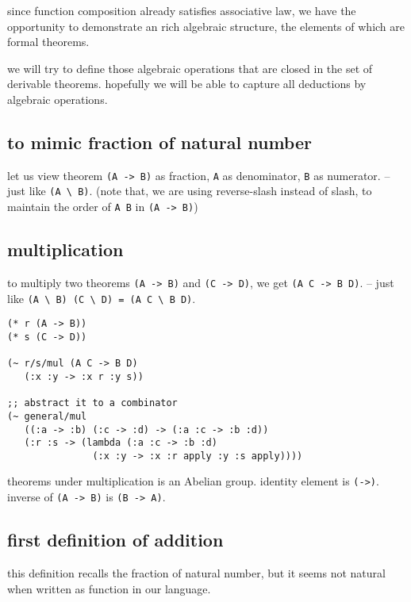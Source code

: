 \documentclass{sigplanconf}
\begin{document}
since function composition already satisfies associative law,
we have the opportunity to demonstrate an rich algebraic structure,
the elements of which are formal theorems.

we will try to define those algebraic operations that are closed in the set of derivable theorems.
hopefully we will be able to capture all deductions by algebraic operations.

\subsection{to mimic fraction of natural number}

let us view theorem {\scriptsize\verb|(A -> B)|} as fraction,
{\scriptsize\verb|A|} as denominator,
{\scriptsize\verb|B|} as numerator.
-- just like {\scriptsize\verb|(A \ B)|}.
(note that,
we are using reverse-slash instead of slash,
to maintain the order of {\scriptsize\verb|A B|} in {\scriptsize\verb|(A -> B)|})

\subsection{multiplication}

to multiply two theorems {\scriptsize\verb|(A -> B)|} and {\scriptsize\verb|(C -> D)|},
we get {\scriptsize\verb|(A C -> B D)|}.
-- just like {\scriptsize\verb|(A \ B) (C \ D) = (A C \ B D)|}.

{\scriptsize\begin{verbatim}
(* r (A -> B))
(* s (C -> D))

(~ r/s/mul (A C -> B D)
   (:x :y -> :x r :y s))

;; abstract it to a combinator
(~ general/mul
   ((:a -> :b) (:c -> :d) -> (:a :c -> :b :d))
   (:r :s -> (lambda (:a :c -> :b :d)
               (:x :y -> :x :r apply :y :s apply))))
\end{verbatim}}

theorems under multiplication is an Abelian group.
identity element is {\scriptsize\verb|(->)|}.
inverse of {\scriptsize\verb|(A -> B)|} is {\scriptsize\verb|(B -> A)|}.

\subsection{first definition of addition}

this definition recalls the fraction of natural number,
but it seems not natural when written as function in our language.
\end{document}
